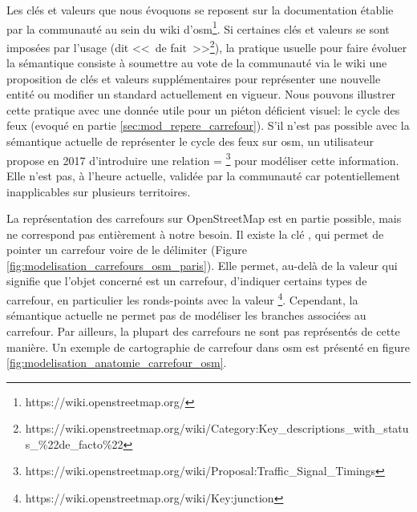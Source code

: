 Les clés et valeurs que nous évoquons se reposent sur la documentation établie par la communauté au sein du wiki d'\gls{osm}\footnote{https://wiki.openstreetmap.org/}. Si certaines clés et valeurs se sont imposées par l'usage (dit <<~de fait~>>\footnote{https://wiki.openstreetmap.org/wiki/Category:Key\_descriptions\_with\_status\_\%22de\_facto\%22}), la pratique usuelle pour faire évoluer la sémantique consiste à soumettre au vote de la communauté via le wiki une proposition de clés et valeurs supplémentaires pour représenter une nouvelle entité ou modifier un standard actuellement en vigueur. Nous pouvons illustrer cette pratique avec une donnée utile pour un piéton déficient visuel: le cycle des feux (evoqué en partie \ref{sec:mod_repere_carrefour}). S'il n'est pas possible avec la sémantique actuelle de représenter le cycle des feux sur \gls{osm}, un utilisateur propose en 2017 d'introduire une relation = \footnote{https://wiki.openstreetmap.org/wiki/Proposal:Traffic\_Signal\_Timings} pour modéliser cette information. Elle n'est pas, à l'heure actuelle, validée par la communauté car potentiellement inapplicables sur plusieurs territoires.

\newpar{}


La représentation des carrefours sur OpenStreetMap est en partie possible, mais ne correspond pas entièrement à notre besoin. Il existe la clé , qui permet de pointer un carrefour voire de le délimiter (Figure \ref{fig:modelisation_carrefours_osm_paris}). Elle permet, au-delà de la valeur  qui signifie que l'objet concerné est un carrefour, d'indiquer certains types de carrefour, en particulier les ronds-points avec la valeur \footnote{https://wiki.openstreetmap.org/wiki/Key:junction}. Cependant, la sémantique actuelle ne permet pas de modéliser les branches associées au carrefour. Par ailleurs, la plupart des carrefours ne sont pas représentés de cette manière. Un exemple de cartographie de carrefour dans \gls{osm} est présenté en figure \ref{fig:modelisation_anatomie_carrefour_osm}.

